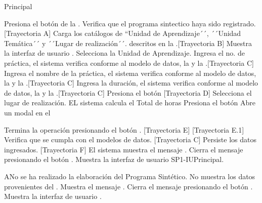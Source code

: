 \begin{UCtrayectoria}{Principal}

    \UCpaso[\UCactor] Presiona el botón  de la .
    \UCpaso Verifica que el programa sintectico haya sido registrado. [Trayectoria A]
    \UCpaso Carga los catálogos de ``Unidad de Aprendizaje´´, ´´Unidad Temática´´ y ´´Lugar de realización´´. descritos en la .[Trayectoria B]
    \UCpaso Muestra la interfaz de usuario .
    \UCpaso[\UCactor] Selecciona la Unidad de Aprendizaje.
    \UCpaso[\UCactor] Ingresa el no. de práctica, el sistema verifica conforme al modelo de datos, la  y la .[Trayectoria C]
    \UCpaso[\UCactor] Ingresa el nombre de la práctica, el sistema verifica conforme al modelo de datos, la  y la .[Trayectoria C]
    \UCpaso[\UCactor] Ingresa la duración, el sistema verifica conforme al modelo de datos, la  y la .[Trayectoria C]
    \UCpaso[\UCactor] Presiona el botón  [Trayectoria D]
    \UCpaso[\UCactor] Selecciona el lugar de realización.
    \UCpaso EL sistema calcula el Total de horas %
    \UCpaso[\UCactor] Presiona el botón 
    \UCpaso Abre un modal en el 

\UCpaso[\UCactor] Termina la operación presionando el botón . [Trayectoria E] [Trayectoria E.1]
	\UCpaso Verifica que se cumpla con el modelos de datos. [Trayectoria C]
	\UCpaso Persiste los datos ingresados. [Trayectoria F]
	\UCpaso El sistema muestra el mensaje .
	\UCpaso[\UCactor] Cierra el mensaje presionando el botón .
	\UCpaso Muestra la interfaz de usuario {SP1-IU}{Principal}.
\end{UCtrayectoria}


\begin{UCtrayectoriaA}{A}{No se ha realizado la elaboración del Programa Sintético.}
	\UCpaso No muestra los datos provenientes del .
	\UCpaso Muestra el mensaje .
	\UCpaso[\UCactor] Cierra el mensaje presionando el botón .
	\UCpaso Muestra la interfaz de usuario .
\end{UCtrayectoriaA}

